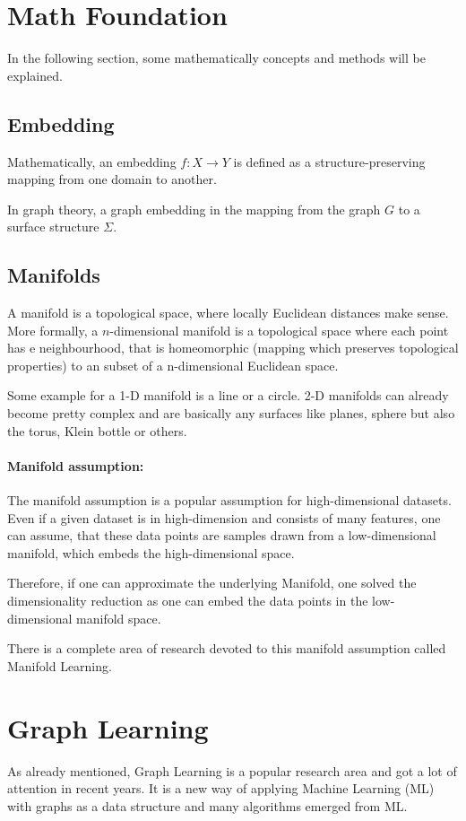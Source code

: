 \section{Math Foundation}
In the following section, some mathematically concepts and methods will be explained.

\subsection{Embedding}
Mathematically, an embedding $f: X \rightarrow Y$ is defined as a structure-preserving mapping from one domain to another.

In graph theory, a graph embedding in the mapping from the graph $G$ to a surface structure $\Sigma$. 


\subsection{Manifolds}
A manifold is a topological space, where locally Euclidean distances make sense.
More formally, a $n$-dimensional manifold is a topological space where
each point has e neighbourhood, that is homeomorphic (mapping which preserves topological properties) to an subset of a n-dimensional
Euclidean space.

Some example for a 1-D manifold is a line or a circle. 2-D manifolds can already become 
pretty complex and are basically any surfaces like planes, sphere but also the torus,
Klein bottle or others.

\paragraph{Manifold assumption:}
\label{sec:manifoldAssumption}

The manifold assumption is a popular assumption for high-dimensional datasets.
Even if a given dataset is in high-dimension and consists of many features, one can assume,
that these data points are samples drawn from a low-dimensional manifold, 
which embeds the high-dimensional space.

Therefore, if one can approximate the underlying Manifold, one solved the dimensionality reduction
as one can embed the data points in the low-dimensional manifold space.

There is a complete area of research devoted to this manifold assumption called Manifold Learning\cite{ManifoldLearning}.




\section{Graph Learning}
As already mentioned, Graph Learning is a popular research area and got a lot of attention in recent years.
It is a new way of applying Machine Learning (ML) with graphs as a data structure and many algorithms emerged from ML.

